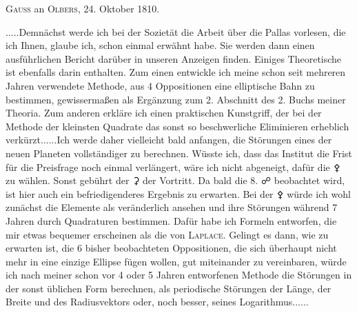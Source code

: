 \par\bigskip
\begin{center}
\textsc{Gauss} an \textsc{Olbers}, 24. Oktober 1810.
\end{center}
\noindent\hspace*{\parindent}.\quad.\quad.\quad.\quad.\quad Demnächst werde ich bei der Sozietät die Arbeit\HistoricalNoteEight{Vgl. Band VI, S. 1.]} über die Pallas vorlesen, die ich Ihnen, glaube ich, schon einmal erwähnt habe. Sie werden dann einen ausführlichen Bericht darüber in unseren Anzeigen finden. Einiges Theoretische ist ebenfalls darin enthalten. Zum einen entwickle ich meine schon seit mehreren Jahren verwendete Methode, aus 4 Oppositionen eine elliptische Bahn zu bestimmen, gewissermaßen als Ergänzung zum 2. Abschnitt des 2. Buchs meiner Theoria. Zum anderen erkläre ich einen praktischen Kunstgriff, der bei der Methode der kleinsten Quadrate das sonst so beschwerliche Eliminieren erheblich verkürzt.\quad.\quad.\quad.\quad.\quad.\quad Ich werde daher vielleicht bald anfangen, die Störungen eines der neuen Planeten vollständiger zu berechnen. Wüsste ich, dass das Institut die Frist für die Preisfrage noch einmal verlängert, wäre ich nicht abgeneigt, dafür die {\AstroSymbols ⚴} zu wählen. Sonst gebührt der {\AstroSymbols ⚳} der Vortritt. Da bald die 8. {\AstroSymbols ☍} beobachtet wird, ist hier auch ein befriedigenderes Ergebnis zu erwarten. Bei der {\AstroSymbols ⚴} würde ich wohl zunächst die Elemente als veränderlich ansehen und ihre Störungen während 7 Jahren durch Quadraturen bestimmen. Dafür habe ich Formeln entworfen, die mir etwas bequemer erscheinen als die von \textsc{Laplace}. Gelingt es dann, wie zu erwarten ist, die 6 bisher beobachteten Oppositionen, die sich überhaupt nicht mehr in eine einzige Ellipse fügen wollen, gut miteinander zu vereinbaren, würde ich nach meiner schon vor 4 oder 5 Jahren entworfenen Methode die Störungen in der sonst üblichen Form berechnen, als periodische Störungen der Länge, der Breite und des Radiusvektors oder, noch besser, seines Logarithmus.\quad.\quad.\quad.\quad.\quad.
\par
